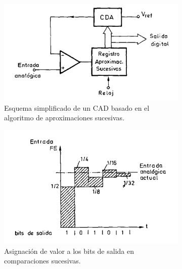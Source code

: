 \begin{figure}[H]
     \centering
     \begin{subfigure}[b]{0.45\textwidth}
         \centering
         \includegraphics[width=\textwidth]{Imagenes/Convertidor de aproximaciones sucesivas.png}
         \caption{Esquema simplificado de un CAD basado en el algoritmo de aproximaciones sucesivas.}
     \end{subfigure}
     \hfill
     \begin{subfigure}[b]{0.45\textwidth}
         \centering
         \includegraphics[width=\textwidth]{Imagenes/Convertidor Aproximaciones Sucesivas Bits.png}
         \caption{Asignación de valor a los bits de salida en comparaciones sucesivas.}
     \end{subfigure}
    \caption{}
\end{figure}